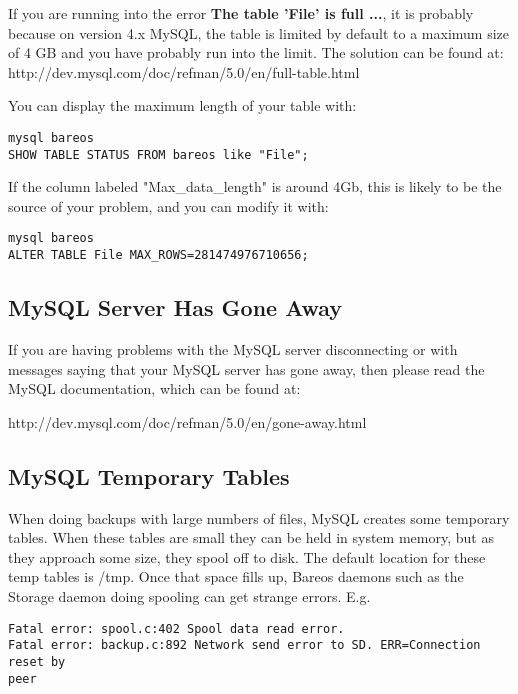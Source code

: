 If you are running into the error {\bf The table 'File' is full ...},
it is probably because on version 4.x MySQL, the table is limited by
default to a maximum size of 4 GB and you have probably run into
the limit. The solution can be found at:
{http://dev.mysql.com/doc/refman/5.0/en/full-table.html}

You can display the maximum length of your table with:

\footnotesize
\begin{verbatim}
mysql bareos
SHOW TABLE STATUS FROM bareos like "File";
\end{verbatim}
\normalsize

If the column labeled "Max\_data\_length" is around 4Gb, this is likely
to be the source of your problem, and you can modify it with:

\footnotesize
\begin{verbatim}
mysql bareos
ALTER TABLE File MAX_ROWS=281474976710656;
\end{verbatim}
\normalsize


\subsection{MySQL Server Has Gone Away}
If you are having problems with the MySQL server disconnecting or with
messages saying that your MySQL server has gone away, then please read
the MySQL documentation, which can be found at:

{http://dev.mysql.com/doc/refman/5.0/en/gone-away.html}

\subsection{MySQL Temporary Tables}
When doing backups with large numbers of files, MySQL creates some
temporary tables.  When these tables are small they can be held in
system memory, but as they approach some size, they
spool off to disk.  The default location for these temp tables is
/tmp.  Once that space fills up, Bareos daemons such as the Storage
daemon doing spooling can get strange errors. E.g.

\footnotesize
\begin{verbatim}
Fatal error: spool.c:402 Spool data read error.
Fatal error: backup.c:892 Network send error to SD. ERR=Connection reset by
peer
\end{verbatim}
\normalsize

